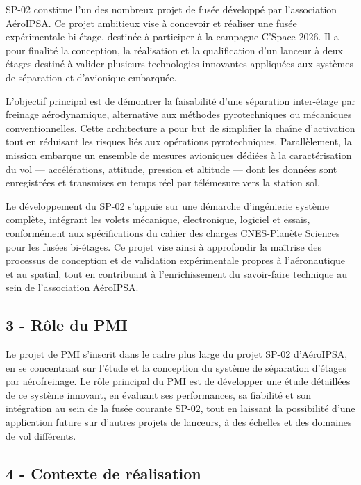 SP-02 constitue l'un des nombreux projet de fusée développé par l’association AéroIPSA. Ce projet ambitieux vise à concevoir et
réaliser une fusée expérimentale bi-étage, destinée à participer à la campagne C'Space 2026. Il a pour finalité la conception,
la réalisation et la qualification d’un lanceur à deux étages destiné à valider plusieurs technologies innovantes appliquées
aux systèmes de séparation et d’avionique embarquée.

L’objectif principal est de démontrer la faisabilité d’une séparation inter-étage par freinage aérodynamique, alternative aux
méthodes pyrotechniques ou mécaniques conventionnelles. Cette architecture a pour but de simplifier la chaîne d’activation tout
en réduisant les risques liés aux opérations pyrotechniques. Parallèlement, la mission embarque un ensemble de mesures
avioniques dédiées à la caractérisation du vol — accélérations, attitude, pression et altitude — dont les données sont
enregistrées et transmises en temps réel par télémesure vers la station sol.

Le développement du SP-02 s’appuie sur une démarche d’ingénierie système complète, intégrant les volets mécanique, électronique,
logiciel et essais, conformément aux spécifications du cahier des charges \acrshort{CNES}-Planète Sciences pour les fusées
bi-étages. Ce projet vise ainsi à approfondir la maîtrise des processus de conception et de validation expérimentale propres à
l’aéronautique et au spatial, tout en contribuant à l’enrichissement du savoir-faire technique au sein de l’association AéroIPSA.

\subsection*{3 - Rôle du PMI}

Le projet de \acrshort{PMI} s'inscrit dans le cadre plus large du projet SP-02 d'AéroIPSA, en se concentrant sur l'étude et la
conception du système de séparation d'étages par aérofreinage. Le rôle principal du \acrshort{PMI} est de développer une
étude détaillées de ce système innovant, en évaluant ses performances, sa fiabilité et son intégration au sein de la fusée
courante SP-02, tout en laissant la possibilité d'une application future sur d'autres projets de lanceurs, à des échelles et des
domaines de vol différents.

\subsection*{4 - Contexte de réalisation}

